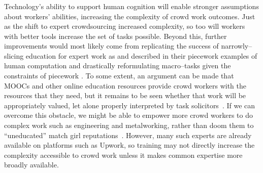 \documentclass[trackingWork]{subfiles}
\begin{document}
\subsubsection{\implication}
Technology's ability to support human cognition will enable stronger assumptions about workers' abilities, increasing the complexity of crowd work outcomes.
Just as the shift to expert crowdsourcing increased complexity, so too will workers with better tools increase the set of tasks possible.
Beyond this, further improvements would most likely come from replicating the success of narrowly--slicing education for expert work as \citeauthor{hart2013rise} and \citeauthor{grier2013computers} described in their piecework examples
of human computation \cite{grier2013computers} and drastically reformulating macro--tasks given the constraints of piecework \cite{hart2013rise}.
To some extent, an argument can be made that
MOOCs and other online education resources
provide crowd workers with the resources that they need, but 
it remains to be seen whether that work will be appropriately valued, let alone
properly interpreted by task solicitors~\cite{aguaded2013mooc}.
If we can overcome this obstacle,
we might be able to empower more crowd workers to do complex work such as engineering and metalworking,
rather than doom them to ``uneducated'' match girl reputations~\cite{10.2307/3827491}.
However, many such experts are already available on platforms such as Upwork, so training may not directly increase the complexity accessible to crowd work unless it makes common expertise more broadly available.
\end{document}
